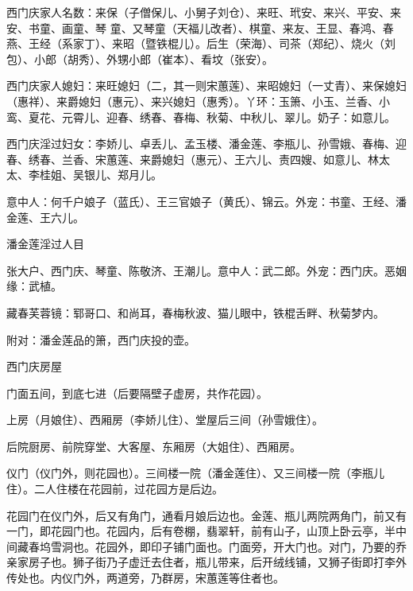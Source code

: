 \begin{showcontents}{}
{西门庆家人名数：来保（子僧保儿、小舅子刘仓）、来旺、玳安、来兴、平安、来安、书童、画童、琴
童、又琴童（天福儿改者）、棋童、来友、王显、春鸿、春燕、王经（系家丁）、来昭（暨铁棍儿）。后生（荣海）、司茶（郑纪）、烧火（刘包）、小郎（胡秀）、外甥小郎（崔本）、看坟（张安）。


西门庆家人媳妇：来旺媳妇（二，其一则宋蕙莲）、来昭媳妇（一丈青）、来保媳妇（惠祥）、来爵媳妇（惠元）、来兴媳妇（惠秀）。丫环：玉箫、小玉、兰香、小鸾、夏花、元霄儿、迎春、绣春、春梅、秋菊、中秋儿、翠儿。奶子：如意儿。

西门庆淫过妇女：李娇儿、卓丢儿、孟玉楼、潘金莲、李瓶儿、孙雪娥、春梅、迎春、绣春、兰香、宋蕙莲、来爵媳妇（惠元）、王六儿、责四嫂、如意儿、林太太、李桂姐、吴银儿、郑月儿。

意中人：何千户娘子（蓝氏）、王三官娘子（黄氏）、锦云。外宠：书童、王经、潘金莲、王六儿。

潘金莲淫过人目

张大户、西门庆、琴童、陈敬济、王潮儿。意中人：武二郎。外宠：西门庆。恶姻缘：武植。

藏春芙蓉镜：郓哥口、和尚耳，春梅秋波、猫儿眼中，铁棍舌畔、秋菊梦内。

附对：潘金莲品的箫，西门庆投的壶。

西门庆房屋

门面五间，到底七进（后要隔壁子虚房，共作花园）。

上房（月娘住）、西厢房（李娇儿住）、堂屋后三间（孙雪娥住）。

后院厨房、前院穿堂、大客屋、东厢房（大姐住）、西厢房。

仪门（仪门外，则花园也）。三间楼一院（潘金莲住）、又三间楼一院（李瓶儿住）。二人住楼在花园前，过花园方是后边。

花园门在仪门外，后又有角门，通看月娘后边也。金莲、瓶儿两院两角门，前又有一门，即花园门也。花园内，后有卷棚，翡翠轩，前有山子，山顶上卧云亭，半中间藏春坞雪洞也。花园外，即印子铺门面也。门面旁，开大门也。对门，乃要的乔亲家房子也。狮子街乃子虚迁去住者，瓶儿带来，后开绒线铺，又狮子街即打李外传处也。内仪门外，两道旁，乃群房，宋蕙莲等住者也。

} %

\end{showcontents}
